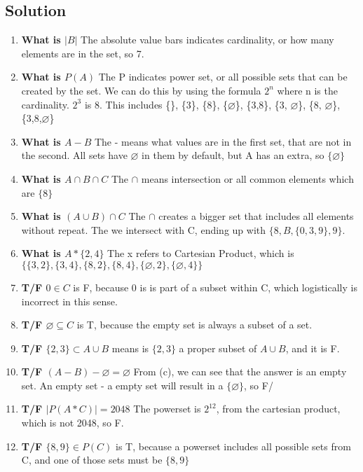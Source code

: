 \documentclass[11pt]{article}
\begin{document}
    \subsection*{Solution}
    \begin{enumerate}[label=(\alph*)]
        \item \textbf{What is \(|B|\)} The absolute value bars indicates cardinality, or how many elements are in the set, so 7.\\
        \item \textbf{What is \(P(A)\)} The P indicates power set, or all possible sets that can be created by the set. We can do this by using the formula \(2^n\) where n is the cardinality. \(2^3\) is 8. This includes  \{\}, \{3\}, \{8\}, \{\(\varnothing\)\}, \{3,8\}, \{3, \(\varnothing\)\}, \{8, \(\varnothing\)\}, \{3,8,\(\varnothing\)\}
        \item \textbf{What is \(A-B\)} The - means what values are in the first set, that are not in the second. All sets have \(\varnothing\) in them by default, but A has an extra, so \(\{\varnothing\}\)\\
        \item \textbf{What is \(A \cap B \cap C\)} The \(\cap\) means intersection or all common elements which are \(\{8\}\) \\
        \item \textbf{What is \((A \cup B) \cap C\)} The \(\cap\) creates a bigger set that includes all elements without repeat. The we intersect with C, ending up with \(\{8,B,\{0,3,9\}, 9\}\). \\
        \item \textbf{What is \(A *\{2,4\}\)} The x refers to Cartesian Product, which is \(\{\{3,2\},\{3,4\},\{8,2\},\{8,4\},\{\varnothing,2\},\{\varnothing,4\}\}\) \\
        \item \textbf{T/F \(0 \in C\)} is F, because 0 is is part of a subset within C, which logistically is incorrect in this sense.\\ 
        \item \textbf{T/F \(\varnothing \subseteq C\)} is T, because the empty set is always a subset of a set. \\
        \item \textbf{T/F \(\{2,3\} \subset A \cup B\)} means is \(\{2,3\}\) a proper subset of \(A \cup B\), and it is F. \\
        \item \textbf{T/F \((A-B) - \varnothing = \varnothing\)} From (c), we can see that the answer is an empty set. An empty set - a empty set will result in a \( \{\varnothing\} \), so F/\\
        \item \textbf{T/F \(|P(A * C)| = 2048\)} The powerset is \(2^12\), from the cartesian product, which is not 2048, so F. \\
        \item \textbf{T/F \(\{8,9\} \in P(C)\)} is T, because a powerset includes all possible sets from C, and one of those sets must be \(\{8,9\}\) \\

    \end{enumerate}
\end{document}
